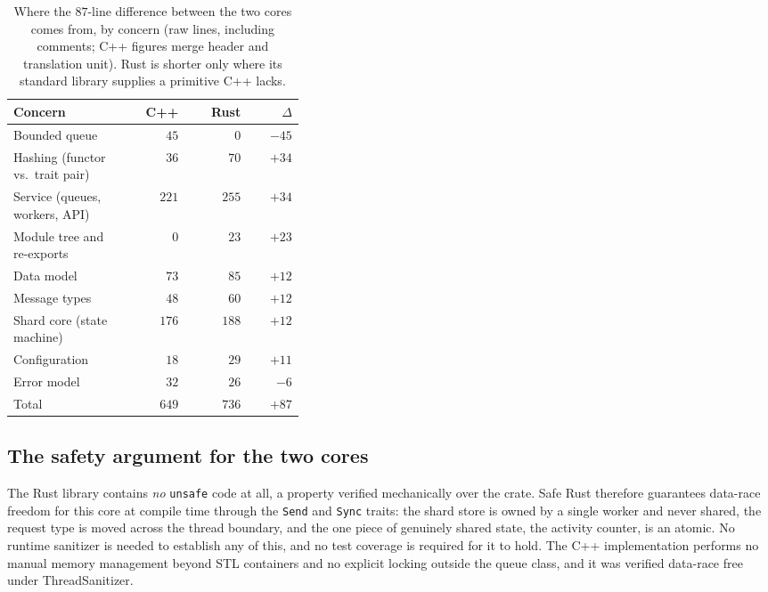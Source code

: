 \documentclass[english,twoside,openright,a4paper,censored,csm,software-track-2020]{HYthesisML}
\begin{document}
\begin{table}
\centering
\small
\caption[Where the line-count difference between the cores comes from]{Where the $87$-line difference between the two cores comes from, by concern (raw
lines, including comments; C++ figures merge header and translation unit). Rust is shorter
only where its standard library supplies a primitive C++ lacks.\label{tab:loc}}
\begin{tabular}{@{}R{0.38\linewidth} r r r@{}}
\hline\hline
Concern & C++ & Rust & $\Delta$ \\
\hline
Bounded queue                     & $45$  & $0$   & $-45$ \\
Hashing (functor vs.\ trait pair) & $36$  & $70$  & $+34$ \\
Service (queues, workers, API)    & $221$ & $255$ & $+34$ \\
Module tree and re-exports        & $0$   & $23$  & $+23$ \\
Data model                        & $73$  & $85$  & $+12$ \\
Message types                     & $48$  & $60$  & $+12$ \\
Shard core (state machine)        & $176$ & $188$ & $+12$ \\
Configuration                     & $18$  & $29$  & $+11$ \\
Error model                       & $32$  & $26$  & $-6$ \\
\hline
Total                             & $649$ & $736$ & $+87$ \\
\hline
\end{tabular}
\end{table}

\subsection{The safety argument for the two cores}
The Rust library contains \emph{no} \texttt{unsafe} code at all, a property verified
mechanically over the crate. Safe Rust therefore guarantees data-race freedom for this core at
compile time through the \texttt{Send} and \texttt{Sync} traits: the shard store is owned by a
single worker and never shared, the request type is moved across the thread boundary, and the
one piece of genuinely shared state, the activity counter, is an atomic. No runtime sanitizer
is needed to establish any of this, and no test coverage is required for it to hold. The C++
implementation performs no manual memory management beyond STL containers and no explicit
locking outside the queue class, and it was verified data-race free under ThreadSanitizer.
\end{document}
